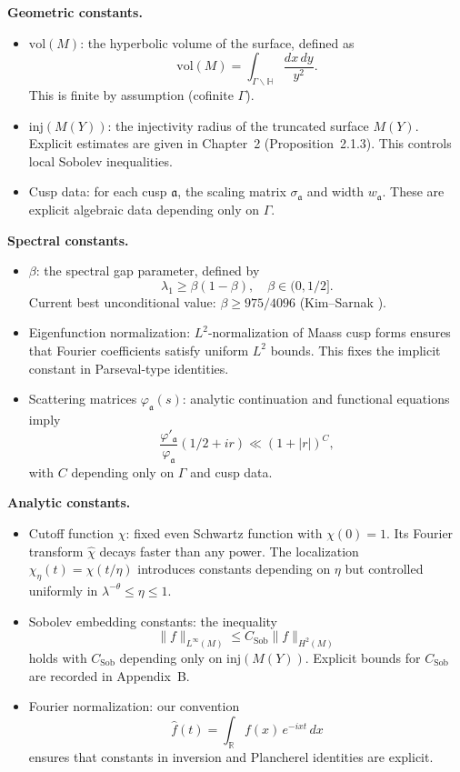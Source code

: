 \medskip

\noindent\textbf{Geometric constants.}
\begin{itemize}
  \item $\mathrm{vol}(M)$: the hyperbolic volume of the surface, defined as
  \[
    \mathrm{vol}(M) = \int_{\Gamma\backslash\mathbb{H}} \frac{dx\,dy}{y^2}.
  \]
  This is finite by assumption (cofinite $\Gamma$).
  \item $\mathrm{inj}(M(Y))$: the injectivity radius of the truncated surface $M(Y)$.
  Explicit estimates are given in Chapter~2 (Proposition~2.1.3).  
  This controls local Sobolev inequalities.
  \item Cusp data: for each cusp $\mathfrak{a}$, the scaling matrix $\sigma_\mathfrak{a}$ and width $w_\mathfrak{a}$.  
  These are explicit algebraic data depending only on $\Gamma$.
\end{itemize}

\medskip

\noindent\textbf{Spectral constants.}
\begin{itemize}
  \item $\beta$: the spectral gap parameter, defined by
  \[
    \lambda_1 \geq \beta(1-\beta), \quad \beta\in(0,1/2].
  \]
  Current best unconditional value: $\beta\geq 975/4096$ (Kim–Sarnak \cite{KimSarnak2003}).
  \item Eigenfunction normalization: $L^2$-normalization of Maass cusp forms ensures that Fourier coefficients satisfy uniform $L^2$ bounds.  
  This fixes the implicit constant in Parseval-type identities.
  \item Scattering matrices $\varphi_\mathfrak{a}(s)$: analytic continuation and functional equations imply
  \[
    \frac{\varphi'_\mathfrak{a}}{\varphi_\mathfrak{a}}(1/2+ir) \ll (1+|r|)^C,
  \]
  with $C$ depending only on $\Gamma$ and cusp data.
\end{itemize}

\medskip

\noindent\textbf{Analytic constants.}
\begin{itemize}
  \item Cutoff function $\chi$: fixed even Schwartz function with $\chi(0)=1$.
  Its Fourier transform $\widehat{\chi}$ decays faster than any power.  
  The localization $\chi_\eta(t)=\chi(t/\eta)$ introduces constants depending on $\eta$ but controlled uniformly in $\lambda^{-\theta}\leq\eta\leq 1$.
  \item Sobolev embedding constants: the inequality
  \[
    \|f\|_{L^\infty(M)} \leq C_{\mathrm{Sob}} \|f\|_{H^2(M)}
  \]
  holds with $C_{\mathrm{Sob}}$ depending only on $\mathrm{inj}(M(Y))$.  
  Explicit bounds for $C_{\mathrm{Sob}}$ are recorded in Appendix~B.
  \item Fourier normalization: our convention
  \[
    \widehat{f}(t) = \int_\mathbb{R} f(x)\,e^{-ixt}\,dx
  \]
  ensures that constants in inversion and Plancherel identities are explicit.
\end{itemize}


